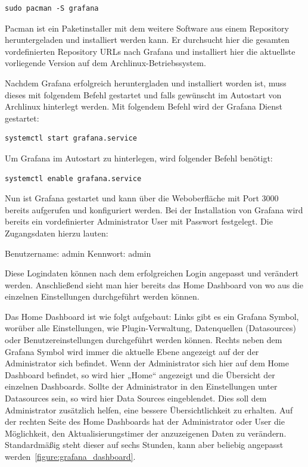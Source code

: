 \begin{verbatim}
sudo pacman -S grafana
\end{verbatim}

Pacman ist ein Paketinstaller mit dem weitere Software aus einem Repository
heruntergeladen und installiert werden kann. Er durchsucht hier die gesamten
vordefinierten Repository URLs nach Grafana und installiert hier die aktuellste
vorliegende Version auf dem Archlinux\hyp{}Betriebssystem.

Nachdem Grafana erfolgreich heruntergladen und installiert worden ist, muss
dieses mit folgendem Befehl gestartet und falls gewünscht im Autostart von
Archlinux hinterlegt werden. Mit folgendem Befehl wird der Grafana Dienst
gestartet:
\begin{verbatim}
systemctl start grafana.service
\end{verbatim}

Um Grafana im Autostart zu hinterlegen, wird folgender Befehl benötigt:
\begin{verbatim}
systemctl enable grafana.service
\end{verbatim}

Nun ist Grafana gestartet und kann über die Weboberfläche mit Port 3000
bereits aufgerufen und konfiguriert werden. Bei der Installation von Grafana
wird bereits ein vordefinierter Administrator User mit Passwort festgelegt. Die
Zugangsdaten hierzu lauten:

\begin{outline}
  \1 Benutzername: admin
  \1 Kennwort: admin
\end{outline}

Diese Logindaten können nach dem erfolgreichen Login angepasst und verändert
werden. Anschließend sieht man hier bereits das Home Dashboard von wo aus die
einzelnen Einstellungen durchgeführt werden können.

Das Home Dashboard ist wie folgt aufgebaut: Links gibt es ein Grafana Symbol,
worüber alle Einstellungen, wie Plugin\hyp{}Verwaltung, Datenquellen
(Datasources) oder Benutzereinstellungen durchgeführt werden können. Rechts
neben dem Grafana Symbol wird immer die aktuelle Ebene angezeigt auf der der
Administrator sich befindet. Wenn der Administrator sich hier auf dem Home
Dashboard befindet, so wird hier „Home“ angezeigt und die Übersicht der
einzelnen Dashboards. Sollte der Administrator in den Einstellungen unter
Datasources sein, so wird hier Data Sources eingeblendet. Dies soll dem
Administrator zusätzlich helfen, eine bessere Übersichtlichkeit zu erhalten.
Auf der rechten Seite des Home Dashboards hat der Administrator oder User die
Möglichkeit, den Aktualisierungstimer der anzuzeigenen Daten zu verändern.
Standardmäßig steht dieser auf sechs Stunden, kann aber beliebig angepasst
werden~\ref{figure:grafana_dashboard}.


